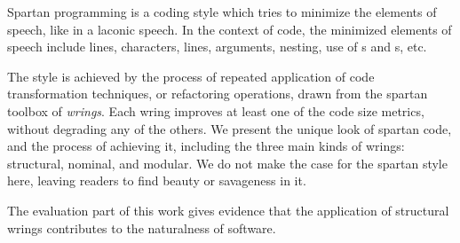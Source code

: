 
Spartan programming is a coding  style which tries to minimize the elements of
speech, like in a laconic speech.
In the context of code, the minimized elements of speech include 
lines, characters, lines, arguments, nesting, use of s and
s, etc.  

The style is achieved by the process of repeated application of code
transformation techniques, or refactoring operations, drawn from the spartan
toolbox of \emph{wrings}.  Each wring improves at least one of the code size
metrics, without degrading any of the others.  We present the unique 
look of spartan code, and the process of achieving it, including 
the three main kinds of wrings: structural, nominal, and modular. 
We do not make the case for the spartan style here, leaving readers to find
beauty or savageness in it. 

The evaluation part of this work gives evidence that the application of
structural wrings contributes to the naturalness of software. 



